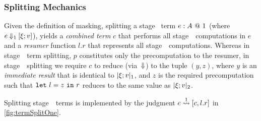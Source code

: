 



\subsubsection{Splitting Mechanics}


Given the definition of masking, splitting a stage \bbone\ term ${e}:{A}~@~ 1$ 
(where $e\mathbin{{\Downarrow_{ 1}}}[\xi;v]$), yields a \emph{combined term}
$c$ that performs all stage~\bbone\ computations in $e$ and a \emph{resumer} function $l.r$ that represents all stage~\bbtwo\ computations.
Whereas in stage~\bbtwo\ term splitting,
$p$ constitutes only the precomputation to the resumer, in stage~\bbone\ splitting we require $c$ to reduce (via~${\Downarrow}$) to the tuple $(y,z)$, where $y$ is an \emph{immediate result} that is identical to $|\xi;v|_{ 1}$, and $z$ is the required precomputation such that ${\tt let}~{l} = {z}~{\tt in}~{r}$ reduces to the same value as $|\xi;v|_{ 2}$. 

Splitting stage~\bbone\ terms is implemented by the judgment $e \overset{ 1}\rightsquigarrow [c,l.r]$ in \ref{fig:termSplitOne}. 


